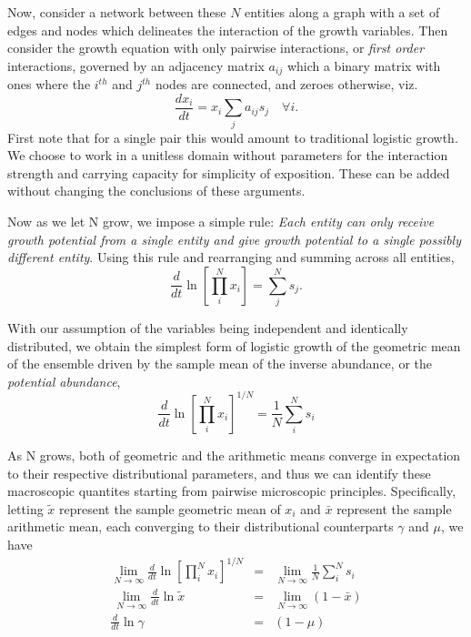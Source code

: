 \documentclass{article}
\begin{document}
Now, consider a network between these $N$ entities along a graph with a set of edges and nodes which delineates the interaction of the growth variables. Then consider the growth equation with only pairwise interactions, or \textit{first order} interactions, governed by an adjacency matrix ${a_{ij}}$ which a binary matrix with ones where the $i^{th}$ and $j^{th}$ nodes are connected, and zeroes otherwise, viz.
\begin{equation}
\label{eq:modSIR}
\frac{d x_i}{dt} = x_i\sum_j{a_{ij}}s_{j} \quad \forall i.
\end{equation}
First note that for a single pair this would amount to traditional logistic growth. We choose to work in a unitless domain without parameters for the interaction strength and carrying capacity for simplicity of exposition. These can be added without changing the conclusions of these arguments. 

Now as we let N grow, we impose a simple rule: \textit{Each entity can only receive growth potential from a single entity and give growth potential to a single possibly different entity}. Using this rule and rearranging and summing across all entities,
\begin{equation}
\label{eq:modSIR2}
\frac{d}{dt} \ln \left[ \prod_i^N x_i \right ] = \sum_j^N s_{j}.
\end{equation}

With our assumption of the variables being independent and identically distributed, we obtain the simplest form of logistic growth of the geometric mean of the ensemble driven by the sample mean of the inverse abundance, or the \textit{potential abundance}, 
\begin{equation}
\label{eq:modSIR3}
\frac{d}{dt} \ln \left[ \prod_i^N x_i \right ]^{1/N} = \frac{1}{N}\sum_i^N s_i 
\end{equation}

As N grows, both of geometric and the arithmetic means converge in expectation to their respective distributional parameters, and thus we can identify these macroscopic quantites starting from pairwise microscopic principles. Specifically, letting $\tilde{x}$ represent the sample geometric mean of $x_i$ and $\bar{x}$ represent the sample arithmetic mean, each converging to their distributional counterparts $\gamma$ and $\mu$, we have 
\begin{eqnarray*}
  \lim_{N\rightarrow \infty} \frac{d}{dt} \ln \left[ \prod_i^N x_i \right ]^{1/N} &=& \lim_{N\rightarrow \infty} \frac{1}{N}\sum_i^N s_i \\\
  \lim_{N\rightarrow \infty} \frac{d}{dt} \ln \tilde{x} &=& \lim_{N\rightarrow \infty}(1 - \bar{x}) \\
  \frac{d}{dt} \ln \gamma &=&(1 - \mu)
\end{eqnarray*}
\end{document}
